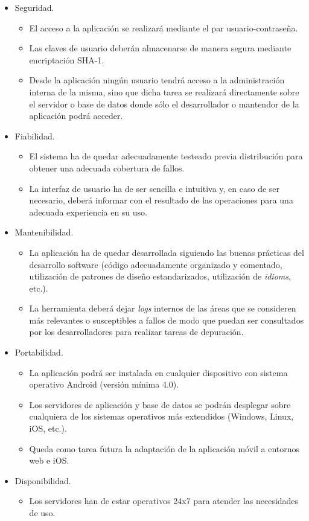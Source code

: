 \begin{itemize}
	\item Seguridad.
	\begin{itemize}
		\item El acceso a la aplicación se realizará mediante el par usuario-contraseña.
		\item Las claves de usuario deberán almacenarse de manera segura mediante encriptación SHA-1.
		\item Desde la aplicación ningún usuario tendrá acceso a la administración interna de la misma, sino que dicha tarea se realizará directamente sobre el servidor o base de datos donde sólo el desarrollador o mantendor de la aplicación podrá acceder.
	\end{itemize}
	\item Fiabilidad.
	\begin{itemize}
		\item El sistema ha de quedar adecuadamente testeado previa distribución para obtener una adecuada cobertura de fallos.
		\item La interfaz de usuario ha de ser sencilla e intuitiva y, en caso de ser necesario, deberá informar con el resultado de las operaciones para una adecuada experiencia en su uso.
	\end{itemize}
	\item Mantenibilidad.
	\begin{itemize}
		\item La aplicación ha de quedar desarrollada siguiendo las buenas prácticas del desarrollo software (código adecuadamente organizado y comentado, utilización de patrones de diseño estandarizados, utilización de \textit{idioms}, etc.).
		\item La herramienta deberá dejar \textit{logs} internos de las áreas que se consideren más relevantes o susceptibles a fallos de modo que puedan ser consultados por los desarrolladores para realizar tareas de depuración.
	\end{itemize}
	\item Portabilidad. 
	\begin{itemize}
		\item La aplicación podrá ser instalada en cualquier dispositivo con sistema operativo Android (versión mínima 4.0).
		\item Los servidores de aplicación y base de datos se podrán desplegar sobre cualquiera de los sistemas operativos más extendidos (Windows, Linux, iOS, etc.).
		\item Queda como tarea futura la adaptación de la aplicación móvil a entornos web e iOS.
	\end{itemize}
	\item Disponibilidad. 
	\begin{itemize}
		\item Los servidores han de estar operativos 24x7 para atender las necesidades de uso.
	\end{itemize}
\end{itemize}


